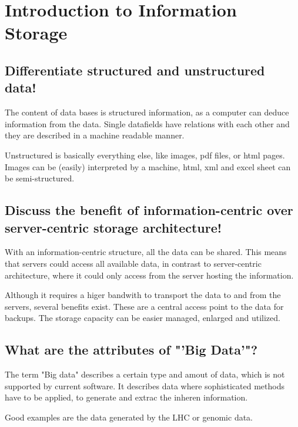 \section{Introduction to Information Storage} %
\label{sec:introduction_to_information_storage}

\subsection*{Differentiate structured and unstructured data!} %
\label{sub:differentiate_structured_and_unstructured_data}
	The content of data bases is structured information,
	as a computer can deduce information from the data.
	Single datafields have relations with each other
	and they are described in a machine readable manner.

	Unstructured is basically everything else,
	like images, pdf files, or html pages.
	Images can be (easily) interpreted by a machine,
	html, xml and excel sheet can be semi-structured.

\subsection{Discuss the benefit of information-centric over server-centric storage architecture!} %
\label{sub:discuss_the_benefit_of_information_centric_over_server_centric_storage_architecture}
	With an information-centric structure,
	all the data can be shared.
	This means that servers could access all available data,
	in contrast to server-centric architecture,
	where it could only access from the server hosting the information.

	Although it requires a higer bandwith to transport the data to and from the servers,
	several benefits exist.
	These are a central access point to the data for backups.
	The storage capacity can be easier managed, enlarged and utilized.

\subsection{What are the attributes of "'Big Data'"?} %
\label{sub:what_are_the_attributes_of_big_data}
	The term "Big data" describes a certain type and amout of data,
	which is not supported by current software.
	It describes data where sophisticated methods have to be applied,
	to generate and extrac the inheren information.

	Good examples are the data generated by the LHC or genomic data.

